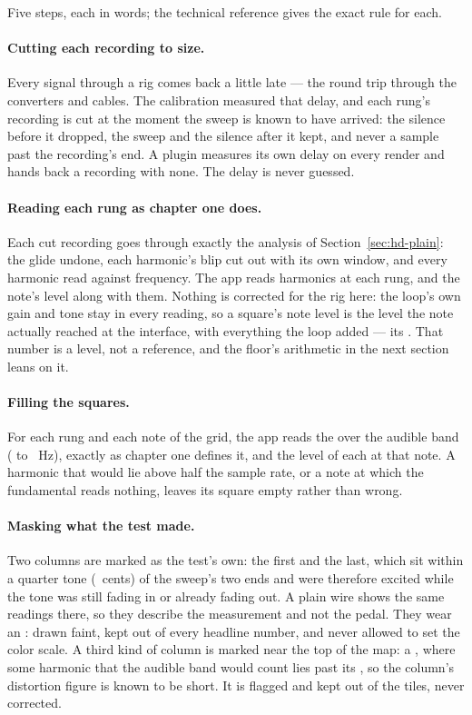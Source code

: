 \documentclass[11pt,a4paper]{article}
\begin{document}
Five steps, each in words; the technical reference gives the exact rule
for each.

\paragraph{Cutting each recording to size.} Every signal through a rig
comes back a little late --- the round trip through the converters and
cables. The calibration measured that delay, and each rung's recording
is cut at the moment the sweep is known to have arrived: the silence
before it dropped, the sweep and the silence after it kept, and never a
sample past the recording's end. A plugin measures its own delay on every
render and hands back a recording with none. The delay is never guessed.

\paragraph{Reading each rung as chapter one does.} Each cut recording
goes through exactly the analysis of Section~\ref{sec:hd-plain}: the
glide undone, each harmonic's blip cut out with its own window, and every
harmonic read against frequency. The app reads \gmHarmonicCount{}
harmonics at each rung, and the note's level along with them. Nothing is
corrected for the rig here: the loop's own gain and tone stay in every
reading, so a square's note level is the level the note actually reached
at the interface, with everything the loop added --- its
. That number is a level, not a reference,
and the floor's arithmetic in the next section leans on it.

\paragraph{Filling the squares.} For each rung and each note of the grid,
the app reads the  over the audible band (\gmAudibleLowHz{} to
\gmAudibleHighHz{}~Hz), exactly as chapter one defines it, and the level
of each  at that note. A harmonic that would lie
above half the sample rate, or a note at which the fundamental reads
nothing, leaves its square empty rather than wrong.

\paragraph{Masking what the test made.} Two columns are marked as the
test's own: the first and the last, which sit within a quarter tone
(\gmEdgeGuardCents{}~cents) of the sweep's two ends and were therefore
excited while the tone was still fading in or already fading out. A
plain wire shows the same readings there, so they describe the
measurement and not the pedal. They wear an : drawn
faint, kept out of every headline number, and never allowed to set the
color scale. A third kind of column is marked near the top of the map: a
, where some harmonic that the audible band would
count lies past its , so the column's distortion
figure is known to be short. It is flagged and kept out of the tiles,
never corrected.
\end{document}
